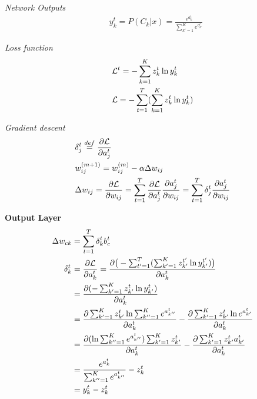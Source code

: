 \documentclass[UTF8]{article}
\begin{document}
        \emph{Network Outputs}
        \begin{align}
        & y_k^t = P(C_k | x) = \frac{e^{a_k^t}}{\sum_{k'=1}^K e^{a_{k'}^t}}
        \end{align}

        \emph{Loss function}
        \begin{align}
        & \mathcal{L}^t=-\sum_{k=1}^K z_k^t \ln y_k^t \notag \\
        & \mathcal{L}=-\sum_{t=1}^T(\sum_{k=1}^K z_k^t \ln y_k^t)
        \end{align}

        \emph{Gradient descent}
        \begin{align}
        & \delta_j^t\stackrel{def}{=} \frac{\partial \mathcal{L}}{\partial a_j^t} \notag \\
        & w_{ij}^{(m+1)}=w_{ij}^{(m)}-\alpha \Delta w_{ij} \\
        & \Delta w_{ij}=\frac{\partial \mathcal{L}}{\partial w_{ij}}
        =\sum_{t=1}^T\frac{\partial \mathcal{L}}{\partial a_j^t}\frac{\partial a_j^t}{\partial w_{ij}}
        =\sum_{t=1}^T\delta_j^t \frac{\partial a_j^t}{\partial w_{ij}}
        \end{align}

        \textbf{Output Layer}
        \begin{align}
         \Delta w_{ck} &= \sum_{t=1}^T \delta_k^t b_c^t \\
         \delta_k^t
            &= \frac{\partial \mathcal{L}}{\partial a_k^t} \notag
            = \frac{\partial \big(-\sum_{t'=1}^T(\sum_{k'=1}^K z_{k'}^{t'} \ln y_{k'}^{t'})\big)}{\partial a_k^t} \notag\\
            &= \frac{\partial (-\sum_{k'=1}^K z_{k'}^{t} \ln y_{k'}^{t})}{\partial a_k^t} \notag\\
            &= \frac{\partial \sum_{k'=1}^K z_{k'}^{t} \ln \sum_{k''=1}^K e^{a_{k''}^t}}{\partial a_k^t}
            - \frac{\partial \sum_{k'=1}^K z_{k'}^{t} \ln e^{a_{k'}^t}}{\partial a_k^t} \notag \\
            &= \frac{\partial ( \ln \sum_{k''=1}^K e^{a_{k''}^t}) \sum_{k'=1}^K z_{k'}^{t} }{\partial a_k^t}
            - \frac{\partial \sum_{k'=1}^K z_{k'}^{t} a_{k'}^t}{\partial a_k^t} \notag \\
            &= \frac{e^{a_k^t}}{\sum_{k''=1}^K e^{a_{k''}^t}} - z_k^t \notag \\
            &= y_k^t - z_k^t
        \end{align}
\end{document}
